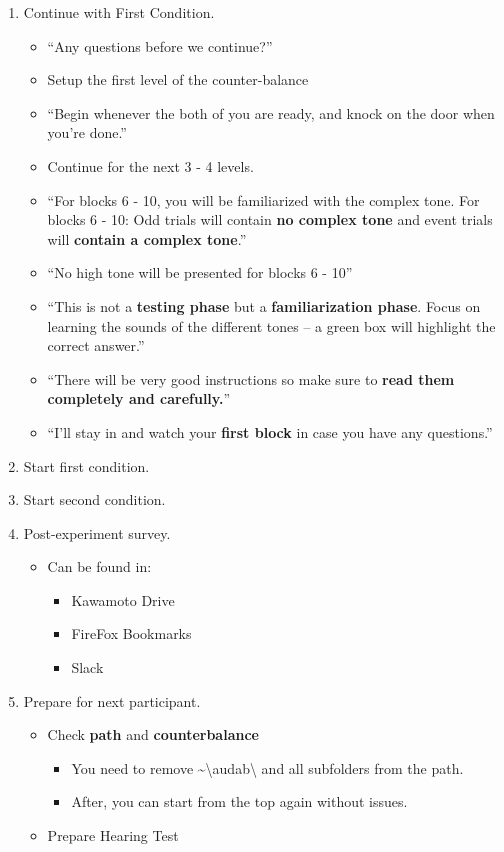 \documentclass[11pt,twoside,letterpaper]{article}
\begin{document}
\begin{enumerate}
\begin{itemize}
		\end{itemize}
	\item Continue with First Condition.
		\begin{itemize}
			\item ``Any questions before we continue?''
			\item Setup the first level of the counter-balance
			\item ``Begin whenever the both of you are ready, and knock on the door when you're done.''
			\item Continue for the next 3 - 4 levels. 
			\item ``For blocks 6 - 10, you will be familiarized with the complex tone. For blocks 6 - 10: Odd trials will contain \textbf{no complex tone} and event trials will \textbf{contain a complex tone}.''
			\item ``No high tone will be presented for blocks 6 - 10''
			\item ``This is not a \textbf{testing phase} but a \textbf{familiarization phase}. Focus on learning the sounds of the different tones -- a green box will highlight the correct answer.''
			\item ``There will be very good instructions so make sure to \textbf{read them completely and carefully.}'' 
			\item ``I'll stay in and watch your \textbf{first block} in case you have any questions.'' 	
		\end{itemize}	
	\item Start first condition.
	\item Start second condition.
	\item Post-experiment survey.
		\begin{itemize}
			\item Can be found in:
				\begin{itemize}
					\item Kawamoto Drive
					\item FireFox Bookmarks
					\item Slack
				\end{itemize}
		\end{itemize}
	\item Prepare for next participant.
		\begin{itemize}
			\item Check \textbf{path} and \textbf{counterbalance}
				\begin{itemize}
					\item You need to remove \textasciitilde\textbackslash audab\textbackslash{} and all subfolders from the path.
					\item After, you can start from the top again without issues.
				\end{itemize}
			\item Prepare Hearing Test
		\end{itemize}	
\end{enumerate}
\end{document}
